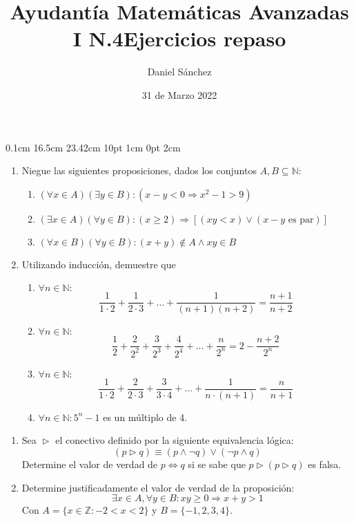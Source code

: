 \documentclass[12pt]{article}
\begin{document}
\setmargins{2.5cm}
{0.1cm}
{16.5cm}
{23.42cm}
{10pt}
{1cm}
{0pt}
{2cm}

\title{Ayudant\'ia Matem\'aticas Avanzadas I N.4}
\date{31 de Marzo 2022}
\author{Daniel S\'anchez}
\maketitle

\begin{enumerate}
      \item Niegue las siguientes proposiciones, dados los conjuntos $A,B \subseteq \mathbb{N}$:
            \begin{enumerate}
                  \item $(\forall x \in A)(\exists y \in B): (x-y<0 \Rightarrow x^{2}-1>9)$
                  \item $(\exists x \in A)(\forall y \in B): (x \geq 2) \Rightarrow [(xy<x) \lor (x-y \mbox{ es par})]$
                  \item $(\forall x \in B)(\forall y \in B): (x+y) \notin A \land xy \in B$
            \end{enumerate}
      \item Utilizando inducci\'on, demuestre que
            \begin{enumerate}
                  \item $\forall n \in \mathbb{N}:$
                        $$\frac{1}{1 \cdot 2}+\frac{1}{2\cdot 3}+...+\frac{1}{(n+1)(n+2)}=\frac{n+1}{n+2}$$
                  \item $\forall n \in \mathbb{N}:$
                        $$\frac{1}{2}+\frac{2}{2^2}+\frac{3}{2^3}+\frac{4}{2^4}+...+\frac{n}{2^n}=2-\frac{n+2}{2^n}$$
                  \item $\forall n \in \mathbb{N}:$
                        $$\frac{1}{1\cdot 2}+\frac{2}{2\cdot 3}+\frac{3}{3\cdot 4}+...+\frac{1}{n\cdot (n+1)}=\frac{n}{n+1}$$
                  \item $\forall n \in \mathbb{N}: 5^{n}-1$ es un m\'ultiplo de 4.
            \end{enumerate}
\end{enumerate}


\pagebreak
\title{\LARGE{\textbf{Ejercicios repaso}}}
\maketitle
\begin{enumerate}
      \item Sea $\vartriangleright$ el conectivo definido por la siguiente equivalencia l\'ogica:
            $$(p \vartriangleright q)\equiv (p \land \neg q)\lor (\neg p \land q)$$
            Determine el valor de verdad de $p\Leftrightarrow q$ si se sabe que $p \vartriangleright (p \vartriangleright q)$ es falsa.
      \item Determine justificadamente el valor de verdad de la proposici\'on:
            $$\exists x \in A, \forall y \in B: xy \geq 0 \Rightarrow x+y>1$$
            Con $A=\{x \in \mathbb{Z}: -2<x<2\}$ y $B=\{-1,2,3,4\}$.
\end{enumerate}
\end{document}
